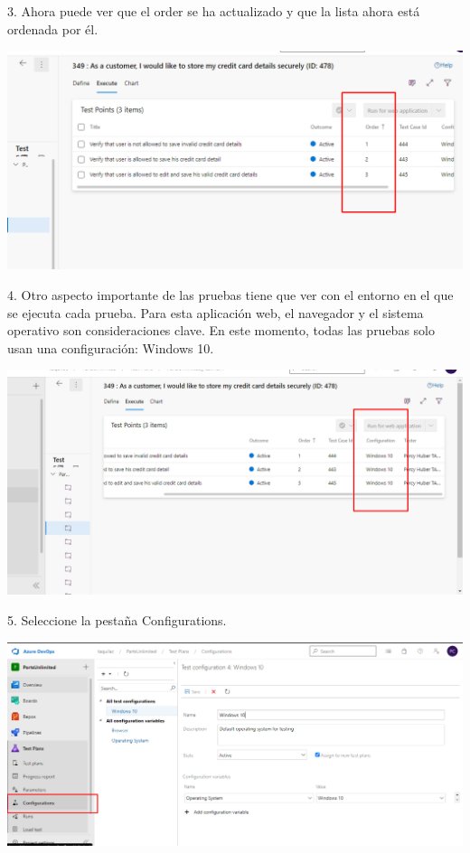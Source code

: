 \documentclass[12pt,letterpaper]{article}
\begin{document}
3. Ahora puede ver que el order se ha actualizado y que la lista ahora está ordenada por él.

\begin{center}
		\includegraphics[width=15cm]{./Imagenes/14} 
\end{center}

4. Otro aspecto importante de las pruebas tiene que ver con el entorno en el que se ejecuta cada prueba. Para esta aplicación web, el navegador y el sistema operativo son consideraciones clave. En este momento, todas las pruebas solo usan una configuración: Windows 10.

\begin{center}
		\includegraphics[width=15cm]{./Imagenes/15} 
\end{center}

5. Seleccione la pestaña Configurations.

\begin{center}
		\includegraphics[width=15cm]{./Imagenes/16} 
\end{center}
\end{document}

